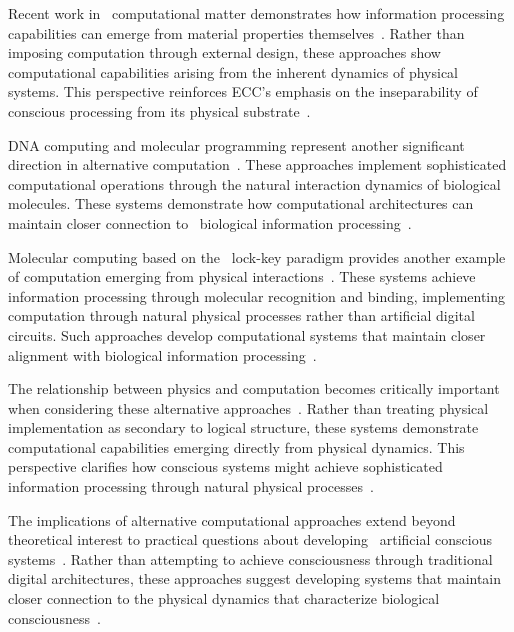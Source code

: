 Recent work in~ computational matter demonstrates how information processing capabilities can emerge from material properties themselves~\cite{Stepney2018,mcfadden2020integrating,Gidon2020}. Rather than imposing computation through external design, these approaches show computational capabilities arising from the inherent dynamics of physical systems. This perspective reinforces ECC's emphasis on the inseparability of conscious processing from its physical substrate~\cite{seth2021being,searle1980minds}.

 DNA computing and molecular programming represent another significant direction in alternative computation~\cite{Tanaka2021,Wheeler2005,London2005}. These approaches implement sophisticated computational operations through the natural interaction dynamics of biological molecules. These systems demonstrate how computational architectures can maintain closer connection to~ biological information processing~\cite{Branco2010,TranVanMinh2015}.

Molecular computing based on the~ lock-key paradigm provides another example of computation emerging from physical interactions~\cite{Zauner2020,gallistel2011memory,Smith2013}. These systems achieve information processing through molecular recognition and binding, implementing computation through natural physical processes rather than artificial digital circuits. Such approaches develop computational systems that maintain closer alignment with biological information processing~\cite{maturana1991autopoiesis,Beniaguev2021}.

The relationship between physics and computation becomes critically important when considering these alternative approaches~\cite{Toffoli2019,hunt2023fields,marr2010vision}. Rather than treating physical implementation as secondary to logical structure, these systems demonstrate computational capabilities emerging directly from physical dynamics. This perspective clarifies how conscious systems might achieve sophisticated information processing through natural physical processes~\cite{butlin2023consciousnessartificialintelligenceinsights,noe2004action}.

The implications of alternative computational approaches extend beyond theoretical interest to practical questions about developing~ artificial conscious systems~\cite{Calude2018a,block1995confusion,bullmore2012economy}. Rather than attempting to achieve consciousness through traditional digital architectures, these approaches suggest developing systems that maintain closer connection to the physical dynamics that characterize biological consciousness~\cite{Deacon2019,thompson2010mind}.

